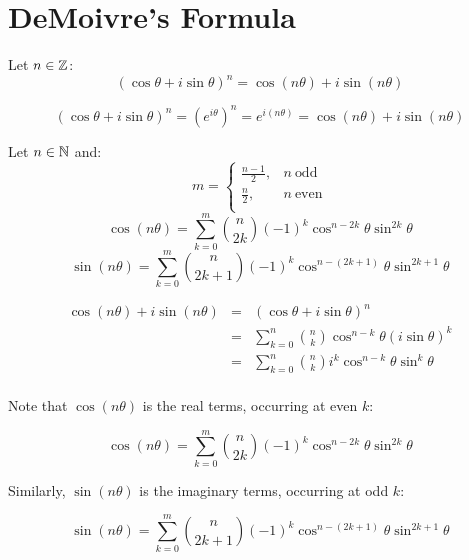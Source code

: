 \documentclass[letterpaper,12pt,fleqn]{article}
\renewcommand{\o}{\theta}
\begin{document}
\section*{DeMoivre's Formula}
\begin{theorem}
Let $n\in\mathbb{Z}$:
\[(\cos\o+i\sin\o)^n=\cos(n\o)+i\sin(n\o)\]
\end{theorem}

\begin{theproof}
\[(\cos\o+i\sin\o)^n=\left(e^{i\o}\right)^n=e^{i(n\o)}=\cos(n\o)+i\sin(n\o)\]
\end{theproof}

\begin{theorem}
Let $n\in\mathbb{N}$ and:
\[m=\begin{cases}
    \frac{n-1}{2}, & n\ \mbox{odd} \\
    \frac{n}{2}, & n\ \mbox{even} \\
\end{cases}\]
\[\cos(n\o)=\sum_{k=0}^m\binom{n}{2k}(-1)^k\cos^{n-2k}\o\sin^{2k}\o\]
\[\sin(n\o)=\sum_{k=0}^m\binom{n}{2k+1}(-1)^k\cos^{n-(2k+1)}\o\sin^{2k+1}\o\]
\end{theorem}

\begin{theproof}
\listbreak
\begin{eqnarray*}
\cos(n\o)+i\sin(n\o) &=& (\cos\o+i\sin\o)^n \\
    &=& \sum_{k=0}^n\binom{n}{k}\cos^{n-k}\o(i\sin\o)^k \\
    &=& \sum_{k=0}^n\binom{n}{k}i^k\cos^{n-k}\o\sin^k\o \\
\end{eqnarray*}

Note that $\cos(n\o)$ is the real terms, occurring at even $k$:

\[\cos(n\o)=\sum_{k=0}^m\binom{n}{2k}(-1)^k\cos^{n-2k}\o\sin^{2k}\o\]

Similarly, $\sin(n\o)$ is the imaginary terms, occurring at odd $k$:

\[\sin(n\o)=\sum_{k=0}^m\binom{n}{2k+1}(-1)^k\cos^{n-(2k+1)}\o\sin^{2k+1}\o\]
\end{theproof}
\end{document}

